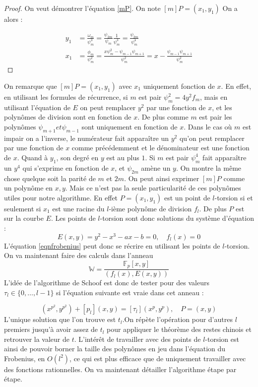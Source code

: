 \documentclass[12pt]{article}
\begin{document}
\begin{proof}
On veut démontrer l'équation \ref{mP}. 
\newline
On note $[m]P = (x_1, y_1)$ 
On a alors : 

\begin{align*}
y_1 &= \frac{\omega_m}{\psi^3_m} = \frac{\psi_{2m}}{\psi_m} \frac{1}{\psi_m^3} = \frac{\psi_{2m}}{\psi_m^4} \\
x_1 &= \frac{\phi_m}{\psi^2_m} =  \frac{x \psi^2_m - \psi_{m-1}\psi_{m+1}}{\psi_m^2} = x - \frac{\psi_{m-1}\psi_{m+1}}{\psi_m^2}	
\end{align*}




\end{proof}
On remarque que $[m]P = (x_1, y_1)$ avec $x_1$ uniquement fonction de $x$. En effet, en utilisant les formules de récurrence, si $m$ est pair $\psi_m^2 = 4y^2f_m$, mais en utilisant l'équation de $E$ on peut remplacer $y^2$ par une fonction de $x$, et les polynômes de division sont en fonction de $x$. De plus comme $m$ est pair les polynômes $\psi_{m+1} et \psi_{m-1}$ sont uniquement en fonction de $x$. Dans le cas où $m$ est impair on a l'inverse, le numérateur fait apparaître un $y^2$ qu'on peut remplacer par une fonction de $x$ comme précédemment et le dénominateur est une fonction de $x$. Quand à $y_1$, son degré en $y$ est au plus $1$. Si $m$ est pair $\psi_m^4$ fait apparaître un $y^4$ qui s'exprime en fonction de $x$, et $\psi_{2m}$ amène un $y$. On montre la même chose quelque soit la parité de $m$ et $2m$.
On peut ainsi exprimer $[m]P$ comme un polynôme en $x,y$. Mais ce n'est pas la seule particularité de ces polynômes utiles pour notre algorithme. En effet $P = (x_1, y_1)$ est un point de $l$-torsion si et seulement si $x_1$ est une racine du $l$-ième polynôme de division $f_l$. De plus $P$ est sur la courbe $E$. Les points de $l$-torsion sont donc solutions du système d'équation : 
\begin{equation}
E(x,y) = y^2 - x^3 - ax - b = 0, \quad f_l(x) = 0
\end{equation}
L'équation \ref{eqnfrobenius} peut donc se récrire en utilisant les points de $l$-torsion. On va maintenant faire des calculs dans l'anneau
$$\mathbb{W}= \frac{\mathbb{F}_p[x,y]}{(f_l(x), E(x,y))}$$
L'idée de l'algorithme de Schoof est donc de tester pour des valeurs $\tau_l \in \lbrace 0, \ldots, l-1 \rbrace$ si l'équation suivante est vraie dans cet anneau :

\begin{equation}
(x^{p^2}, y^{p^2}) + [p_l](x,y) = [\tau_l](x^{p}, y^{p}),  \quad P=(x,y)
\end{equation}
L'unique solution que l'on trouve est $t_l$.On répète l'opération pour d'autres $l$ premiers jusqu'à avoir assez de $t_l$ pour appliquer le théorème des restes chinois et retrouver la valeur de $t$. L'intérêt de travailler avec des points de $l$-torsion est ainsi de pouvoir borner la taille des polynômes en jeu dans l'équation du Frobenius, en $O(l^2)$, ce qui est plus efficace que de uniquement travailler avec des fonctions rationnelles.
\newline
\medskip
On va maintenant détailler l'algorithme étape par étape. 
\end{document}
